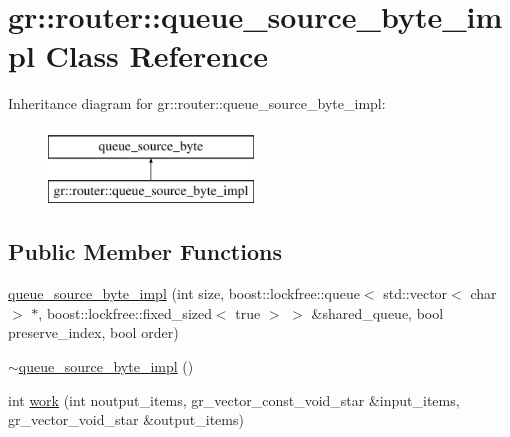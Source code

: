 \hypertarget{classgr_1_1router_1_1queue__source__byte__impl}{\section{gr\+:\+:router\+:\+:queue\+\_\+source\+\_\+byte\+\_\+impl Class Reference}
\label{classgr_1_1router_1_1queue__source__byte__impl}
}
Inheritance diagram for gr\+:\+:router\+:\+:queue\+\_\+source\+\_\+byte\+\_\+impl\+:\begin{figure}[H]
\begin{center}
\leavevmode
\includegraphics[height=2.000000cm]{classgr_1_1router_1_1queue__source__byte__impl}
\end{center}
\end{figure}
\subsection*{Public Member Functions}
\begin{DoxyCompactItemize}
\item 
\hyperlink{classgr_1_1router_1_1queue__source__byte__impl_af26965726f7f3c102c91e3cd78809070}{queue\+\_\+source\+\_\+byte\+\_\+impl} (int size, boost\+::lockfree\+::queue$<$ std\+::vector$<$ char $>$ $\ast$, boost\+::lockfree\+::fixed\+\_\+sized$<$ true $>$ $>$ \&shared\+\_\+queue, bool preserve\+\_\+index, bool order)
\item 
\hyperlink{classgr_1_1router_1_1queue__source__byte__impl_aa657da4357a0b8642ac71b07015934f3}{$\sim$queue\+\_\+source\+\_\+byte\+\_\+impl} ()
\item 
int \hyperlink{classgr_1_1router_1_1queue__source__byte__impl_acb768ac0c1e6e26a12e6cc31379ed415}{work} (int noutput\+\_\+items, gr\+\_\+vector\+\_\+const\+\_\+void\+\_\+star \&input\+\_\+items, gr\+\_\+vector\+\_\+void\+\_\+star \&output\+\_\+items)
\end{DoxyCompactItemize}


